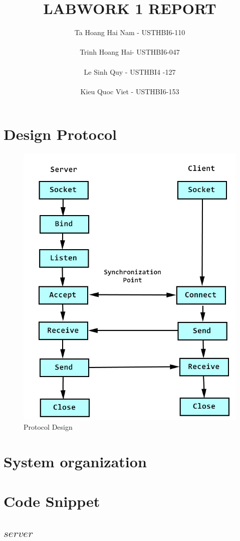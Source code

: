 \documentclass[10.5pt,a4paper]{article}
\title{LABWORK 1 REPORT}
\author{Ta Hoang Hai Nam - USTHBI6-110 \\ \\ Trinh Hoang Hai- USTHBI6-047 \\ \\ Le Sinh Quy - USTHBI4 -127 \\ \\ Kieu Quoc Viet - USTHBI6-153}
\begin{document}
\maketitle
\newpage 
\section{Design Protocol}
\begin{figure}[h!]
\includegraphics[width=\linewidth]{design_protocol.jpg}
\caption{Protocol Design}
\end{figure}
\section{System organization}

\section{Code Snippet}
\subsection*{$server$}

\end{document}
